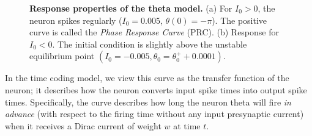 \begin{figure}
\centering
{}
\caption{\textbf{Response properties of the theta model.}
(a) For $I_0 > 0$, the neuron spikes regularly ($I_0 = 0.005$, $\theta(0) = -\pi$). 
The positive curve is called the \emph{Phase Response Curve} (PRC).
(b) Response for $I_0 < 0$.
The initial condition is slightly above the unstable equilibrium point $(I_0 = -0.005, \theta_0 = \theta_0^+ + 0.0001)$.}
\label{response}
\end{figure}

In the time coding model, we view this curve as the transfer function of the neuron; 
it describes how the neuron converts input spike times into output spike times.
Specifically, the curve describes how long the neuron theta will fire \emph{in advance}
(with respect to the firing time without any input presynaptic current) 
when it receives a Dirac current of weight $w$ at time $t$. 



